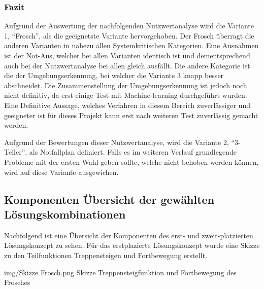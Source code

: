 \subsubsection{Fazit}
Aufgrund der Auswertung der nachfolgenden Nutzwertanalyse wird die Variante 1, ``Frosch'', als die geeignetste Variante hervorgehoben. Der Frosch überragt die anderen Varianten in nahezu allen Systemkritischen Kategorien. Eine Ausnahmen ist der Not-Aus, welcher bei allen Varianten identisch ist und dementsprechend auch bei der Nutzwertanalyse bei allen gleich ausfällt. Die andere Kategorie ist die der Umgebungserkennung, bei welcher die Variante 3 knapp besser abschneidet. Die Zusammenstellung der Umgebungserkennung ist jedoch noch nicht definitiv, da erst einige Test mit Machine-learning durchgeführt wurden. Eine Definitive Aussage, welches Verfahren in diesem Bereich zuverlässiger und geeigneter ist für dieses Projekt kann erst nach weiteren Test zuverlässig gemacht werden.

Aufgrund der Bewertungen dieser Nutzwertanalyse, wird die Variante 2, ``3-Teiler'', als Notfallplan definiert. Falls es im weiteren Verlauf grundlegende Probleme mit der ersten Wahl geben sollte, welche nicht behoben werden können, wird auf diese Variante ausgewichen.

\subsection{Komponenten Übersicht der gewählten Lösungskombinationen}
Nachfolgend ist eine Übersicht der Komponenten des erst- und zweit-platzierten Lösungskonzept zu sehen. Für das erstplazierte Lösungskonzept wurde eine Skizze zu den Teilfunktionen Treppensteigen und Fortbewegung erstellt.

\vspace{2cm}

\image
   {img/Skizze Frosch.png}
   {Skizze Treppensteigfunktion und Fortbewegung des Frosches}

